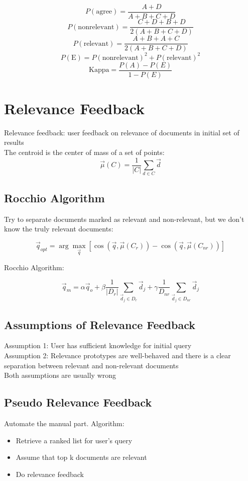 \begin{multicols*}{2}
$$P(\text{agree}) = \frac{A+D}{A+B+C+D}$$
$$P(\text{nonrelevant}) = \frac{C + D + B +D}{2(A+B+C+D)}$$
$$P(\text{relevant}) = \frac{A+B+A+C}{2(A+B+C+D)}$$
$$P(\text{E}) = P(\text{nonrelevant})^2 + P(\text{relevant})^2$$
$$\text{Kappa}=\frac{P(A)-P(E)}{1-P(E)}$$

\section{Relevance Feedback}

\noindent Relevance feedback: user feedback on relevance of documents in initial set of results \\

\noindent The centroid is the center of mass of a set of points:
$$\vec{\mu}(C)=\frac{1}{|C|} \sum_{d\in C} \vec{d}$$

\subsection{Rocchio Algorithm}
\noindent Try to separate documents marked as relevant and non-relevant, but we don’t know the truly relevant documents:

$$\vec{q}_{opt}=\arg\!\max_{\vec{q}}[ \cos(\vec{q},\vec{\mu}(C_r)) - \cos(\vec{q},\vec{\mu}(C_{nr}))]$$

\noindent Rocchio Algorithm:

$$\vec{q}_m = \alpha \vec{q}_o + \beta \frac{1}{|D_r|} \sum_{\vec{d}_j \in D_r} \vec{d}_j + \gamma \frac{1}{D_{nr}} \sum_{\vec{d}_j \in D_{nr}} \vec{d}_j$$

\subsection{Assumptions of Relevance Feedback}

\noindent Assumption 1: User has sufficient knowledge for initial query \\

\noindent Assumption 2: Relevance prototypes are well-behaved and there is a clear separation between relevant and non-relevant documents\\

\noindent Both assumptions are usually wrong

\subsection{Pseudo Relevance Feedback}
Automate the manual part. Algorithm:
\begin{itemize}
    \item Retrieve a ranked list for user’s query
    \item Assume that top k documents are relevant
    \item Do relevance feedback
\end{itemize}


\end{multicols*}
